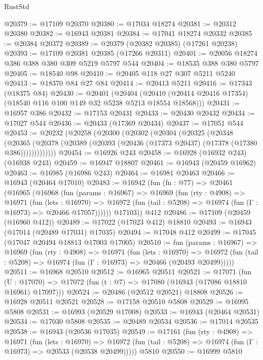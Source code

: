 \begin{lexlean}{RustStd}
\begin{coremodule}
@20379 := @17109 @20370
@20380 := @17034 @18274
@20381 := @20312 @20380
@20382 := @16943 @20381
@20384 := @17041 @18274 @20332
@20385 := @20384 @20372
@20389 := @20379 (@20382 @20385) (@17261 @20238)
@20393 := @17109 @20381 @20385 (@17266 @20311)
@20401 := @20056 @18274 @386 @388 @380 @309 @5219 @5797 @544
@20404 := @18535 @388 @380 @5797
@20405 := @18540 @98
@20410 := @20405 @118 @27 @307 @5211 @5240
@20413 := @18370 @84 @27 @84
@20414 := @20413 @5211
@20416 := @17343 (@18375 @84)
@20430 := @20401
    (@20404 (@20410 (@20414 @20416 @17354) (@18540 @116 @100 @149 @32 @5238 @5213 @18554 @18568)))
@20431 := @16957 @386
@20432 := @17153 @20431
@20433 := @20430 @20432
@20434 := @17027 @544
@20436 := @20433 (@17369 @20434)
@20437 := @17051 @544
@20453 := @20232
    (@20258
      (@20300
        (@20302
          (@20304
            (@20325
              (@20348
                (@20365
                  (@20378 (@20389 (@20393 (@20436 (@17373 @20437) (@17378 (@17380 @386)))))))))))))
@20454 := @16926 @243
@20458 := @16928 (@16932 @243) (@16938 @243)
@20459 := @16947 @18807
@20461 := @16943 (@20459 @16962)
@20463 := @16985 (@16986 @243)
@20464 := @16981 @20463
@20466 := @16943 (@20464 @17010)
@20483 := @16942
    (fun (fn : @77) =>
    @20461
      (@16965
        (@16968
          (fun (params : @16967) =>
          @16969
            (fun (rty : @4908) =>
            @16971
              (fun (lets : @16970) =>
              @16972 (fun (tail : @5208) => @16974 (fun (Γ : @16973) => @20466 @17057))))))
        @17103))
    @412
@20486 := @17109 (@20459 (@16960 @412))
@20489 := @17022 (@17023 @412) @18810
@20493 := @16943 (@17014 (@20489 @17031) @17035)
@20494 := @17048 @412
@20499 := @17045 (@17047 @20494 @18813 @17003 @17005)
@20510 := fun (params : @16967) =>
  @16969
    (fun (rty : @4908) =>
    @16971
      (fun (lets : @16970) =>
      @16972 (fun (tail : @5208) => @16974 (fun (Γ : @16973) => @20466 (@20493 @20499)))))
@20511 := @16968 @20510
@20512 := @16965 @20511
@20521 := @17071
    (fun (U : @17070) => @17072 (fun (t : @7) => @17080 (@16943 (@17086 @18810 @16961) @17097)))
@20524 := @20486 (@20512 @20521) @18808
@20526 := @16928 @20511 @20521
@20528 := @17158 @20510 @5808
@20529 := @16995 @5808
@20531 := @16993 (@20529 @17008)
@20533 := @16943 (@20464 @20531)
@20534 := @17030 @5808
@20535 := @20489 @20534
@20536 := @17014 @20535
@20538 := @16943 (@20536 @17035)
@20549 := @17161
    (fun (rty : @4908) =>
    @16971
      (fun (lets : @16970) =>
      @16972 (fun (tail : @5208) => @16974 (fun (Γ : @16973) => @20533 (@20538 @20499)))))
    @5810
@20550 := @16999 @5810

\end{coremodule}
\end{lexlean}
